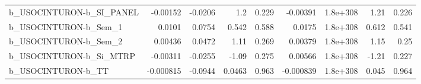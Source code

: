 \begin{tabular}{lrrrrrrrr}
b\_USOCINTURON-b\_SI\_PANEL     &    -0.00152 &      -0.0206 &       1.2 &    0.229 &   -0.00391 &    1.8e+308 &         1.21 &         0.226 \\
b\_USOCINTURON-b\_Sem\_1        &      0.0101 &       0.0754 &     0.542 &    0.588 &     0.0175 &    1.8e+308 &        0.612 &         0.541 \\
b\_USOCINTURON-b\_Sem\_2        &     0.00436 &       0.0472 &      1.11 &    0.269 &    0.00379 &    1.8e+308 &         1.15 &          0.25 \\
b\_USOCINTURON-b\_Si\_MTRP      &    -0.00311 &      -0.0255 &     -1.09 &    0.275 &    0.00566 &    1.8e+308 &        -1.21 &         0.227 \\
b\_USOCINTURON-b\_TT           &   -0.000815 &      -0.0944 &    0.0463 &    0.963 &  -0.000839 &    1.8e+308 &        0.045 &         0.964 \\
\bottomrule
\end{tabular}

